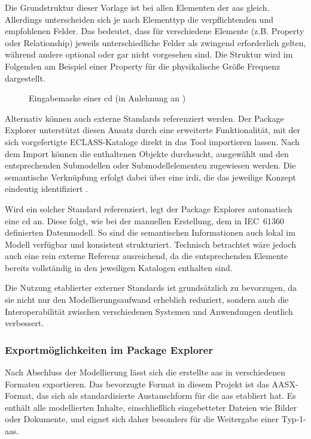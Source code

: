 Die Grundstruktur dieser Vorlage ist bei allen Elementen der \acs{aas} gleich.
Allerdings unterscheiden sich je nach Elementtyp die verpflichtenden und empfohlenen Felder.
Das bedeutet, dass für verschiedene Elemente (z.B. Property oder Relationship) jeweils unterschiedliche Felder als zwingend erforderlich gelten, während andere optional oder gar nicht vorgesehen sind.
Die Struktur wird im Folgenden am Beispiel einer Property für die physikalische Größe Frequenz dargestellt.

\vspace{0.25em}
\begin{figure}[htbp]
    \centering
    
    \vspace{-0.5em}
    \caption[Eingabemaske einer \acs{cd}]{Eingabemaske einer \acs{cd} (in Anlehnung an \cite{SpezifikationPart3a})}
    \label{fig:SubmodellTypenschild}
\end{figure}
\vspace{-0.35em}

Alternativ können auch externe Standards referenziert werden. 
Der Package Explorer unterstützt diesen Ansatz durch eine erweiterte Funktionalität, mit der sich vorgefertigte ECLASS-Kataloge direkt in das Tool importieren lassen. 
Nach dem Import können die enthaltenen Objekte durchsucht, ausgewählt und den entsprechenden Submodellen oder Submodellelementen zugewiesen werden. 
Die semantische Verknüpfung erfolgt dabei über eine \acs{irdi}, die das jeweilige Konzept eindeutig identifiziert \cite{eclass_irdi}. 

Wird ein solcher Standard referenziert, legt der Package Explorer automatisch eine \acs{cd} an.
Diese folgt, wie bei der manuellen Erstellung, dem in IEC~61360 definierten Datenmodell.  
So sind die semantischen Informationen auch lokal im Modell verfügbar und konsistent strukturiert.
Technisch betrachtet wäre jedoch auch eine rein externe Referenz ausreichend, da die entsprechenden Elemente bereits vollständig in den jeweiligen Katalogen enthalten sind.

Die Nutzung etablierter externer Standards ist grundsätzlich zu bevorzugen, da sie nicht nur den Modellierungsaufwand erheblich reduziert, sondern auch die Interoperabilität zwischen verschiedenen Systemen und Anwendungen deutlich verbessert.

\subsubsection*{Exportmöglichkeiten im Package Explorer}
\vspace{-0.5em}
Nach Abschluss der Modellierung lässt sich die erstellte \acs{aas} in verschiedenen Formaten exportieren.
Das bevorzugte Format in diesem Projekt ist das AASX-Format, das sich als standardisierte Austauschform für die \acs{aas} etabliert hat.
Es enthält alle modellierten Inhalte, einschließlich eingebetteter Dateien wie Bilder oder Dokumente, und eignet sich daher besonders für die Weitergabe einer Typ-1-\acs{aas}.


